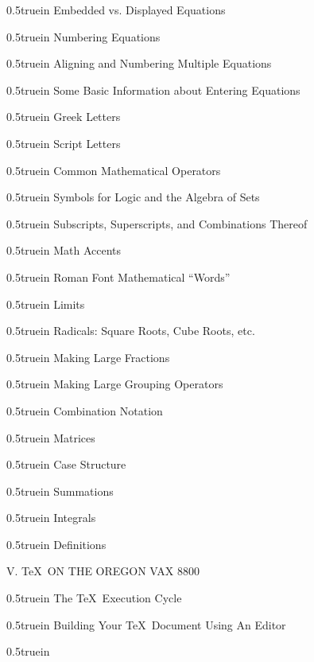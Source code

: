 \par\hglue 0.5truein
Embedded vs. Displayed Equations \leaderfill{}
\par\hglue 0.5truein
Numbering Equations \leaderfill{}
\par\hglue 0.5truein
Aligning and Numbering Multiple Equations \leaderfill{}
\par\hglue 0.5truein
Some Basic Information about Entering Equations \leaderfill{}
\par\hglue 0.5truein
Greek Letters \leaderfill{}
\par\hglue 0.5truein
Script Letters \leaderfill{}
\par\hglue 0.5truein
Common Mathematical Operators \leaderfill{}
\par\hglue 0.5truein
Symbols for Logic and the Algebra of Sets \leaderfill{}
\par\hglue 0.5truein
Subscripts, Superscripts, and Combinations Thereof \leaderfill{}
\par\hglue 0.5truein
Math Accents \leaderfill{}
\par\hglue 0.5truein
Roman Font Mathematical ``Words'' \leaderfill{}
\par\hglue 0.5truein
Limits \leaderfill{}
\par\hglue 0.5truein
Radicals: Square Roots, Cube Roots, etc. \leaderfill{}
\par\hglue 0.5truein
Making Large Fractions \leaderfill{}
\par\hglue 0.5truein
Making Large Grouping Operators \leaderfill{}
\par\hglue 0.5truein
Combination Notation \leaderfill{}
\par\hglue 0.5truein
Matrices \leaderfill{}
\par\hglue 0.5truein
Case Structure \leaderfill{}
\par\hglue 0.5truein
Summations \leaderfill{}
\par\hglue 0.5truein
Integrals \leaderfill{}
\par\hglue 0.5truein
Definitions \leaderfill{}
\bigskip\par\noindent
V. \TeX\ ON THE OREGON VAX 8800
\medskip\par\hglue 0.5truein
The \TeX\ Execution Cycle \leaderfill{} 
\par\hglue 0.5truein
Building Your \TeX\ Document Using An Editor \leaderfill{}
\par\hglue 0.5truein
